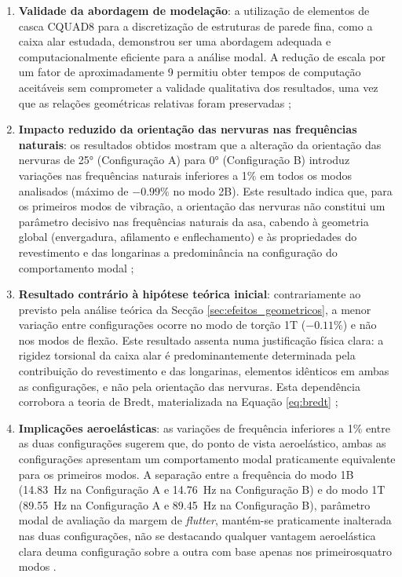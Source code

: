 \documentclass[11pt,oneside,a4paper,final]{report}
\begin{document}
\begin{enumerate}
    \item \textbf{Validade da abordagem de modelação}: a utilização de elementos de casca CQUAD8 para a discretização de estruturas de parede fina, como a caixa alar estudada, demonstrou ser uma abordagem adequada e computacionalmente eficiente para a análise modal. A redução de escala por um fator de aproximadamente 9 permitiu obter tempos de computação aceitáveis sem comprometer a validade qualitativa dos resultados, uma vez que as relações geométricas relativas foram preservadas \cite{Craig2006};


    \item \textbf{Impacto reduzido da orientação das nervuras nas frequências naturais}: os resultados obtidos mostram que a alteração da orientação das nervuras de 25° (Configuração A) para 0° (Configuração B) introduz variações nas frequências naturais inferiores a 1\% em todos os modos analisados (máximo de $-0.99\%$ no modo 2B). Este resultado indica que, para os primeiros modos de vibração, a orientação das nervuras não constitui um parâmetro decisivo nas frequências naturais da asa, cabendo à geometria global (envergadura, afilamento e enflechamento) e às propriedades do revestimento e das longarinas a predominância na configuração do comportamento modal \cite{Craig2006, Wright2015};

    \item \textbf{Resultado contrário à hipótese teórica inicial}: contrariamente ao previsto pela análise teórica da Secção \ref{sec:efeitos_geometricos}, a menor variação entre configurações ocorre no modo de torção 1T ($-0.11\%$) e não nos modos de flexão. Este resultado assenta numa justificação física clara: a rigidez torsional da caixa alar é predominantemente determinada pela contribuição do revestimento e das longarinas, elementos idênticos em ambas as configurações, e não pela orientação das nervuras. Esta dependência corrobora a teoria de Bredt, materializada na Equação \eqref{eq:bredt} \cite{Megson2012, Niu1988};

    \item \textbf{Implicações aeroelásticas}: as variações de frequência inferiores a 1\% entre as duas configurações sugerem que, do ponto de vista aeroelástico, ambas as configurações apresentam um comportamento modal praticamente equivalente para os primeiros modos. A separação entre a frequência do modo 1B (14.83~Hz na Configuração A e 14.76~Hz na Configuração B) e do modo 1T (89.55~Hz na Configuração A e 89.45~Hz na Configuração B), parâmetro modal de avaliação da margem de \textit{flutter}, mantém-se praticamente inalterada nas duas configurações, não se destacando qualquer vantagem aeroelástica clara deuma configuração sobre a outra com base apenas nos primeirosquatro modos \cite{Fung1993, Wright2015}.


\end{enumerate}
\end{document}
